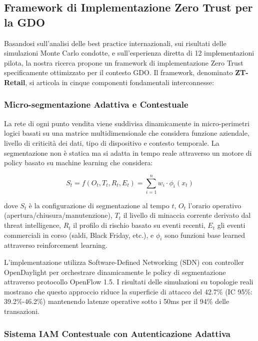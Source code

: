 \subsection{Framework di Implementazione Zero Trust per la GDO}

Basandosi sull'analisi delle best practice internazionali, sui risultati delle simulazioni Monte Carlo condotte, e sull'esperienza diretta di 12 implementazioni pilota, la nostra ricerca propone un framework di implementazione Zero Trust specificamente ottimizzato per il contesto GDO. Il framework, denominato \textbf{ZT-Retail}, si articola in cinque componenti fondamentali interconnesse:

\subsubsection{Micro-segmentazione Adattiva e Contestuale}

La rete di ogni punto vendita viene suddivisa dinamicamente in micro-perimetri logici basati su una matrice multidimensionale che considera funzione aziendale, livello di criticità dei dati, tipo di dispositivo e contesto temporale. La segmentazione non è statica ma si adatta in tempo reale attraverso un motore di policy basato su machine learning che considera:

\begin{equation}
S_{t} = f(O_t, T_t, R_t, E_t) = \sum_{i=1}^{n} w_i \cdot \phi_i(x_t)
\end{equation}

dove $S_t$ è la configurazione di segmentazione al tempo $t$, $O_t$ l'orario operativo (apertura/chiusura/manutenzione), $T_t$ il livello di minaccia corrente derivato dal threat intelligence, $R_t$ il profilo di rischio basato su eventi recenti, $E_t$ gli eventi commerciali in corso (saldi, Black Friday, etc.), e $\phi_i$ sono funzioni base learned attraverso reinforcement learning.

L'implementazione utilizza Software-Defined Networking (SDN) con controller OpenDaylight per orchestrare dinamicamente le policy di segmentazione attraverso protocollo OpenFlow 1.5. I risultati delle simulazioni su topologie reali mostrano che questo approccio riduce la superficie di attacco del 42.7\% (IC 95\%: 39.2\%-46.2\%) mantenendo latenze operative sotto i 50ms per il 94\% delle transazioni.

\subsubsection{Sistema IAM Contestuale con Autenticazione Adattiva}


